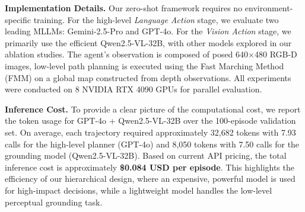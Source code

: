 \documentclass[letterpaper, 10 pt, conference]{ieeeconf}
\begin{document}
\noindent\textbf{Implementation Details.}
Our zero-shot framework requires no environment-specific training. For the high-level \textit{Language Action} stage, we evaluate two leading MLLMs: Gemini-2.5-Pro and GPT-4o. For the \textit{Vision Action} stage, we primarily use the efficient Qwen2.5-VL-32B, with other models explored in our ablation studies. The agent's observation is composed of posed 640$\times$480 RGB-D images, low-level path planning is executed using the Fast Marching Method (FMM) on a global map constructed from depth observations. All experiments were conducted on 8 NVIDIA RTX 4090 GPUs for parallel evaluation.


\noindent\textbf{Inference Cost.} 
To provide a clear picture of the computational cost, we report the token usage for GPT-4o + Qwen2.5-VL-32B over the 100-episode validation set. 
On average, each trajectory required approximately 32,682 tokens with 7.93 calls for the high-level planner (GPT-4o) and 8,050 tokens with 7.50 calls for the grounding model (Qwen2.5-VL-32B).
Based on current API pricing, the total inference cost is approximately \textbf{\$0.084 USD per episode}.
This highlights the efficiency of our hierarchical design, where an expensive, powerful model is used for high-impact decisions, while a lightweight model handles the low-level perceptual grounding task.
\end{document}
